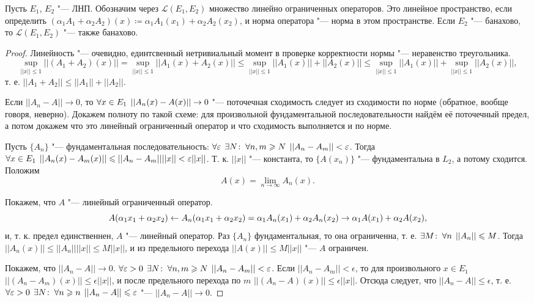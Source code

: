 \documentclass[main]{subfiles}
\begin{document}
\begin{theorem}
  Пусть \( E_1 \), \( E_2 \) "--- ЛНП.
  Обозначим через \( \mathcal{L}(E_1, E_2) \)
  множество линейно ограниченных операторов.
  Это линейное пространство, если определить
  \( (\alpha_1 A_1 + \alpha_2 A_2)(x) \coloneqq
  \alpha_1 A_1 (x_1) + \alpha_2 A_2(x_2) \),
  и норма оператора "--- норма в этом пространстве.
  Если \( E_2 \) "--- банахово, то
  \( \mathcal{L}(E_1, E_2) \) "--- также банахово.
\end{theorem}
\begin{proof}
  Линейность "--- очевидно, единтсвенный нетривиальный
  момент в проверке корректности нормы "--- неравенство
  треугольника.
  \[
    \sup_{||x|| \le 1} ||(A_1 + A_2)(x)|| =
    \sup_{||x|| \le 1} ||A_1(x) + A_2(x)|| \le
    \sup_{||x|| \le 1} ||A_1(x)|| + ||A_2(x)|| \le
    \sup_{||x|| \le 1} ||A_1(x)|| + \sup_{||x|| \le 1} ||A_2(x)||,
  \]
  т. е. \( ||A_1 + A_2|| \le ||A_1|| + ||A_2|| \).

  Если \( ||A_n - A|| \to 0 \), то
  \( \forall {x \in E_1} \; \, ||A_n(x) - A(x)|| \to 0 \) "---
  поточечная сходимость следует из сходимости по норме
  (обратное, вообще говоря, неверно).
  Докажем полноту по такой схеме: для произвольной
  фундаментальной последовательности найдём её поточечный
  предел, а потом докажем что это линейный ограниченный оператор
  и что сходимость выполняется и по норме.
  
  Пусть \( \{ A_n \} \) "--- фундаментальная последовательность:
  \( \forall {\varepsilon} \; \, \exists N \colon \: \forall {n, m \geqslant N} \; \, ||A_n - A_m|| < \varepsilon \).
  Тогда \( \forall {x \in E_1} \; \, ||A_n(x) - A_m(x)|| \leqslant
  ||A_n - A_m|| ||x|| < \varepsilon ||x|| \). Т. к.
  \( ||x|| \) "--- константа, то \( \{ A(x_n) \} \) "--- фундаментальна
  в \( L_2 \), а потому сходится. Положим
  \[ A(x) = \lim_{n \to \infty} A_n(x). \]

  Покажем, что \( A \) "--- линейный ограниченный оператор.
  \[
    A(\alpha_1 x_1 + \alpha_2 x_2) \leftarrow A_n(\alpha_1 x_1 +
    \alpha_2 x_2) = \alpha_1 A_n(x_1) + \alpha_2 A_n(x_2)
    \to \alpha_1 A(x_1) + \alpha_2 A(x_2),
  \]
  и, т. к. предел единственнен, \( A \) "--- линейный оператор.
  Раз \( \{ A_n \} \) фундаментальная, то она ограниченна,
  т. е. \( \exists M \colon \: \forall {n} \; \, ||A_n|| \leqslant M \).
  Тогда \( ||A_n(x)|| \le ||A_n||||x|| \le M ||x|| \),
  и из предельного перехода \( ||A(x)|| \le M ||x|| \) "---
  \( A \) ограничен.

  Покажем, что \( ||A_n - A|| \to 0 \).
  \( \forall {\varepsilon> 0} \; \, \exists N \colon \: \forall {n, m \geqslant N} \; \,
  ||A_n - A_m|| < \varepsilon \).
  Если \( ||A_n - A_m|| < \epsilon \), то для произвольного
  \( x \in E_1 \) \( ||(A_n - A_m)(x)|| \le \epsilon ||x|| \),
  и после предельного перехода по \( m \) \( ||(A_n - A)(x)|| \le \epsilon ||x|| \).
  Отсюда следует, что \( ||A_n - A|| \le \epsilon \),
  т. е. \( \forall {\varepsilon> 0} \; \, \exists N \colon \:
  \forall {n \geqslant n} \; \, ||A_n - A|| \leqslant \varepsilon \) "---
  \( ||A_n - A|| \to 0 \).
\end{proof}
\end{document}
